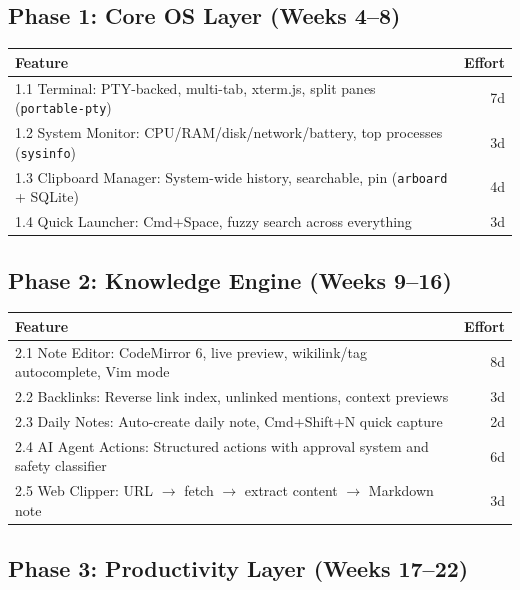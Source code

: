 \documentclass[11pt,a4paper]{article}
\begin{document}
\subsection{Phase 1: Core OS Layer (Weeks 4--8)}

\begin{table}[h]\centering\small
\begin{tabularx}{\textwidth}{Xr}
\toprule
\textbf{Feature} & \textbf{Effort} \\
\midrule
1.1 Terminal: PTY-backed, multi-tab, xterm.js, split panes (\texttt{portable-pty}) & 7d \\
1.2 System Monitor: CPU/RAM/disk/network/battery, top processes (\texttt{sysinfo}) & 3d \\
1.3 Clipboard Manager: System-wide history, searchable, pin (\texttt{arboard} + SQLite) & 4d \\
1.4 Quick Launcher: Cmd+Space, fuzzy search across everything & 3d \\
\bottomrule
\end{tabularx}
\end{table}

\subsection{Phase 2: Knowledge Engine (Weeks 9--16)}

\begin{table}[h]\centering\small
\begin{tabularx}{\textwidth}{Xr}
\toprule
\textbf{Feature} & \textbf{Effort} \\
\midrule
2.1 Note Editor: CodeMirror 6, live preview, wikilink/tag autocomplete, Vim mode & 8d \\
2.2 Backlinks: Reverse link index, unlinked mentions, context previews & 3d \\
2.3 Daily Notes: Auto-create daily note, Cmd+Shift+N quick capture & 2d \\
2.4 AI Agent Actions: Structured actions with approval system and safety classifier & 6d \\
2.5 Web Clipper: URL $\to$ fetch $\to$ extract content $\to$ Markdown note & 3d \\
\bottomrule
\end{tabularx}
\end{table}

\subsection{Phase 3: Productivity Layer (Weeks 17--22)}
\end{document}
